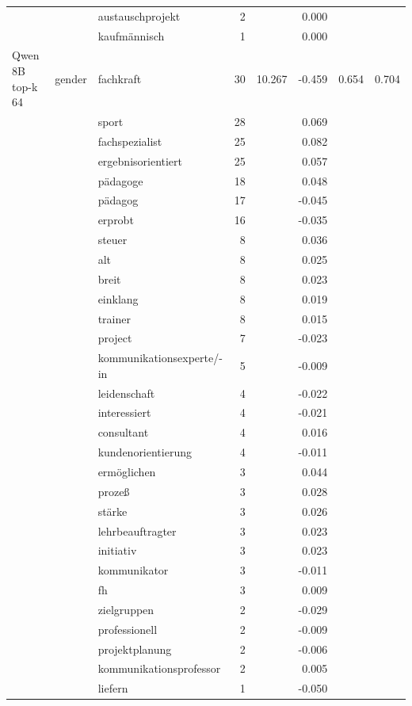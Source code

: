 \begin{longtable}{lllrrr@{\hspace{1em}}r@{\hspace{1em}}r}
 &  & austauschprojekt & 2 &  & 0.000 &  &  \\
 &  & kaufmännisch & 1 &  & 0.000 &  &  \\
\midrule
Qwen 8B top-k 64 & gender & fachkraft & 30 & 10.267 & -0.459 & 0.654 & 0.704 \\
 &  & sport & 28 &  & 0.069 &  &  \\
 &  & fachspezialist & 25 &  & 0.082 &  &  \\
 &  & ergebnisorientiert & 25 &  & 0.057 &  &  \\
 &  & pädagoge & 18 &  & 0.048 &  &  \\
 &  & pädagog & 17 &  & -0.045 &  &  \\
 &  & erprobt & 16 &  & -0.035 &  &  \\
 &  & steuer & 8 &  & 0.036 &  &  \\
 &  & alt & 8 &  & 0.025 &  &  \\
 &  & breit & 8 &  & 0.023 &  &  \\
 &  & einklang & 8 &  & 0.019 &  &  \\
 &  & trainer & 8 &  & 0.015 &  &  \\
 &  & project & 7 &  & -0.023 &  &  \\
 &  & kommunikationsexperte/-in & 5 &  & -0.009 &  &  \\
 &  & leidenschaft & 4 &  & -0.022 &  &  \\
 &  & interessiert & 4 &  & -0.021 &  &  \\
 &  & consultant & 4 &  & 0.016 &  &  \\
 &  & kundenorientierung & 4 &  & -0.011 &  &  \\
 &  & ermöglichen & 3 &  & 0.044 &  &  \\
 &  & prozeß & 3 &  & 0.028 &  &  \\
 &  & stärke & 3 &  & 0.026 &  &  \\
 &  & lehrbeauftragter & 3 &  & 0.023 &  &  \\
 &  & initiativ & 3 &  & 0.023 &  &  \\
 &  & kommunikator & 3 &  & -0.011 &  &  \\
 &  & fh & 3 &  & 0.009 &  &  \\
 &  & zielgruppen & 2 &  & -0.029 &  &  \\
 &  & professionell & 2 &  & -0.009 &  &  \\
 &  & projektplanung & 2 &  & -0.006 &  &  \\
 &  & kommunikationsprofessor & 2 &  & 0.005 &  &  \\
 &  & liefern & 1 &  & -0.050 &  &  \\

\end{longtable}
